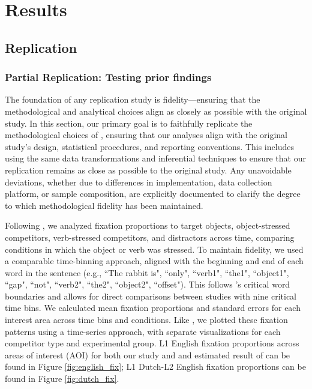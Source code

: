 
\section{Results}
\subsection{Replication}
\subsubsection{Partial Replication: Testing prior findings}

The foundation of any replication study is fidelity—ensuring that the methodological and analytical choices align as closely as possible with the original study. In this section, our primary goal is to faithfully replicate the methodological choices of \cite{ge2021a}, ensuring that our analyses align with the original study’s design, statistical procedures, and reporting conventions. This includes using the same data transformations and inferential techniques to ensure that our replication remains as close as possible to the original study. Any unavoidable deviations, whether due to differences in implementation, data collection platform, or sample composition, are explicitly documented to clarify the degree to which methodological fidelity has been maintained.

Following \cite{ge2021a}, we analyzed fixation proportions to target objects, object-stressed competitors, verb-stressed competitors, and distractors across time, comparing conditions in which the object or verb was stressed. To maintain fidelity, we used a comparable time-binning approach, aligned with the beginning and end of each word in the sentence (e.g., ``The rabbit is", ``only", ``verb1", ``the1", ``object1", ``gap", ``not", ``verb2", ``the2", ``object2", ``offset"). This follows \cite{ge2021a}’s critical word boundaries and allows for direct comparisons between studies with nine critical time bins. We calculated mean fixation proportions and standard errors for each interest area across time bins and conditions. Like \cite{ge2021a}, we plotted these fixation patterns using a time-series approach, with separate visualizations for each competitor type and experimental group. L1 English fixation proportions across areas of interest (AOI) for both our study and and estimated result of \cite{ge2021a} can be found in Figure \ref{fig:english_fix}; L1 Dutch-L2 English fixation proportions can be found in Figure \ref{fig:dutch_fix}.

